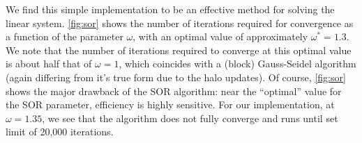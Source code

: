 We find this simple implementation to be an effective method for solving the
linear system.
\cref{fig:sor} shows the number of iterations required for
convergence as a function of the parameter $\omega$, with an optimal value of
approximately $\omega^*=1.3$.
We note that the number of iterations required to converge at this optimal value
is about half that of $\omega=1$, which coincides with a (block) Gauss-Seidel algorithm
(again differing from it's true form due to the halo updates).
Of course, \cref{fig:sor} shows the major drawback of the SOR algorithm: near
the ``optimal'' value for the SOR parameter, efficiency is highly sensitive.
For our implementation, at $\omega=1.35$, we see that the algorithm does not
fully converge and runs until set limit of 20,000 iterations.
